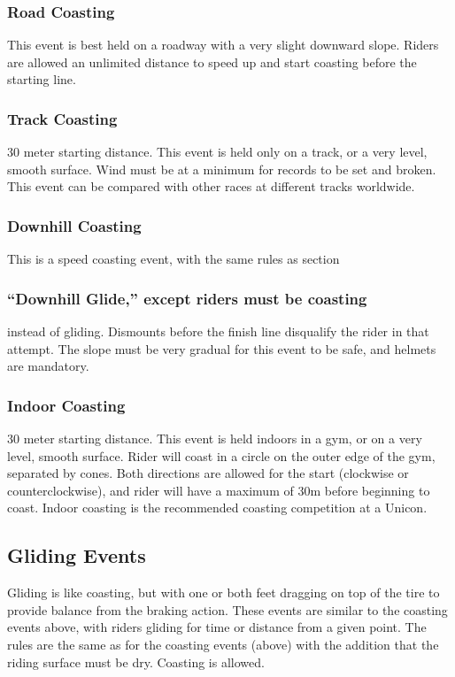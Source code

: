 \subsubsection{Road Coasting}
This event is best held on a roadway with a very slight downward slope.
Riders are allowed an unlimited distance to speed up and start coasting before the starting line.

\subsubsection{Track Coasting \label{subsubsec:track-field_alternate-optional-fun-events_coasting_track-coasting}}
30 meter starting distance.
This event is held only on a track, or a very level, smooth surface.
Wind must be at a minimum for records to be set and broken.
This event can be compared with other races at different tracks worldwide.

\subsubsection{Downhill Coasting}
This is a speed coasting event, with the same rules as section 
\subsubsection{``Downhill Glide,'' except riders must be coasting}
instead of gliding.
Dismounts before the finish line disqualify the rider in that attempt.
The slope must be very gradual for this event to be safe, and helmets are mandatory.

\subsubsection{Indoor Coasting}
30 meter starting distance.
This event is held indoors in a gym, or on a very level, smooth surface.
Rider will coast in a circle on the outer edge of the gym, separated by cones.
Both directions are allowed for the start (clockwise or counterclockwise), and rider will have a maximum of 30m before beginning to coast.
Indoor coasting is the recommended coasting competition at a Unicon.

\subsection{Gliding Events}
Gliding is like coasting, but with one or both feet dragging on top of the tire to provide balance from the braking action.
These events are similar to the coasting events above, with riders gliding for time or distance from a given point.
The rules are the same as for the coasting events (above) with the addition that the riding surface must be dry.
Coasting is allowed.

